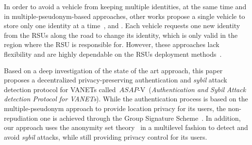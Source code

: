 \documentclass[preprint,12pt]{elsarticle}
\newcommand{\protocolname}{$ASAP$-V}
\begin{document}
In order to avoid a vehicle from keeping multiple identities, at the same time and in multiple-pseudonym-based approaches, other works propose a single vehicle to store only one identity at a time~\cite{keys-distro4}, \cite{keys-distro7} and \cite{profile-generation1}. Each vehicle requests one new identity from the RSUs along the road to change its identity, which is only valid in the region where the RSU is responsible for. However, these approaches lack flexibility and are highly dependable on the RSUs deployment methods~\cite{rsu-placement1}.


Based on a deep investigation of the state of the art approach, this paper proposes a decentralized privacy-preserving authentication and \textit{sybil} attack detection protocol for VANETs called~\protocolname~(\textit{Authentication and Sybil Attack detection Protocol for VANETs}). While the authentication process is based on the multiple-pseudonym approach to provide location privacy for its users, the non-repudiation one is achieved through the Group Signature Scheme~\cite{group-sign}. In addition, our approach uses the anonymity set theory~\cite{k-anonymity} in a multilevel fashion to detect and avoid \textit{sybil} attacks, while still providing privacy control for its users.

\end{document}
